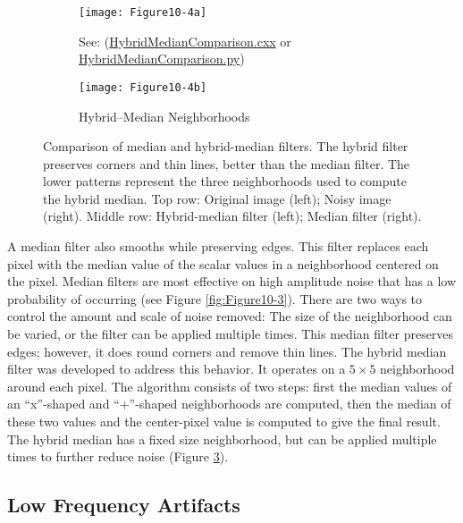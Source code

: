 \begin{figure}[htb]
	\begin{subfigure}[h]{0.96\linewidth}
		\texttt{[image: Figure10-4a]}
		\captionsetup{justification=centering}
		\caption*{See: (\href{https://lorensen.github.io/VTKExamples/site/Cxx/ImageProcessing/HybridMedianComparison/}{HybridMedianComparison.cxx} or \href{https://lorensen.github.io/VTKExamples/site/Python/ImageProcessing/HybridMedianComparison/}{HybridMedianComparison.py})}
		\label{fig:Figure10-4a}
	\end{subfigure}
	\hfill
	\begin{subfigure}[h]{0.32\linewidth}
		\texttt{[image: Figure10-4b]}
		\captionsetup{justification=centering}
		\caption*{Hybrid--Median Neighborhoods}
		\label{fig:Figure10-4b}
	\end{subfigure}
	\caption{Comparison of median and hybrid-median filters. The hybrid filter preserves corners and thin lines, better than the median filter. The lower patterns represent the three neighborhoods used to compute the hybrid median. Top row: Original image (left); Noisy image (right). Middle row: Hybrid-median filter (left); Median filter (right).}\label{fig:Figure10-4}
\end{figure}

A median filter also smooths while preserving edges. This filter replaces each pixel with the median value of the scalar values in a neighborhood centered on the pixel. Median filters are most effective on high amplitude noise that has a low probability of occurring (see Figure \ref{fig:Figure10-3}). There are two ways to control the amount and scale of noise removed: The size of the neighborhood can be varied, or the filter can be applied multiple times. This median filter preserves edges; however, it does round corners and remove thin lines. The hybrid median filter was developed to address this behavior. It operates on a $5 \times 5$ neighborhood around each pixel. The algorithm consists of two steps: first the median values of an ``x''-shaped and ``+''-shaped neighborhoods are computed, then the median of these two values and the center-pixel value is computed to give the final result. The hybrid median has a fixed size neighborhood, but can be applied multiple times to further reduce noise (Figure \ref{fig:Figure10-4}).

\subsection{Low Frequency Artifacts}

